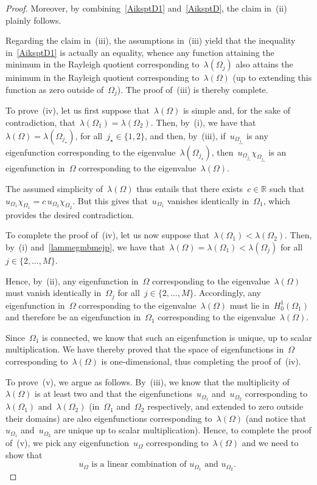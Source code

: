\documentclass[10pt,a4paper]{amsart}
\def \R {\mathbb{R}}
\begin{document}
\begin{proof}
Moreover, by combining~\eqref{AiksptD1} and~\eqref{AiksptD}, the claim in~(ii) plainly follows.

Regarding the claim in~(iii), the assumptions in~(iii) yield that the inequality in~\eqref{AiksptD1}
is actually an equality, whence any function attaining the minimum
in the Rayleigh quotient corresponding to~$\lambda(\Omega_j)$
also attains the minimum
in the Rayleigh quotient corresponding to~$\lambda(\Omega)$
(up to extending this function as zero outside of~$\Omega_j$).
The proof of~(iii) is thereby complete.

To prove~(iv), 
let us first suppose that~$\lambda(\Omega)$ is simple and, for the sake of
contradiction, that~$\lambda(\Omega_1)=\lambda(\Omega_2)$.
Then, by~(i), we have that~$\lambda(\Omega)=\lambda(\Omega_{j_\star})$, for all~$j_\star\in\{1,2\}$,
and then, by~(iii), if~$
u_{\Omega_{j_\star}}$ is any eigenfunction corresponding to the eigenvalue~$\lambda(\Omega_{j_\star})$,
then~$u_{\Omega_{j_\star}}\chi_{\Omega_{j_\star}}$ is
an eigenfunction in~$\Omega$ corresponding to the eigenvalue~$\lambda(\Omega)$.

The assumed simplicity of~$\lambda(\Omega)$ thus entails that there exists~$c\in\R$ such that~$ u_{\Omega_{1}}\chi_{\Omega_{1}}=c\,u_{\Omega_{2}}\chi_{\Omega_{2}}$. But this gives that~$u_{\Omega_1}$ vanishes identically
in~$\Omega_1$, which provides the desired contradiction.

To complete the proof of~(iv), let us now suppose that~$\lambda(\Omega_1)<\lambda(\Omega_2)$.
Then, by~(i) and~\eqref{lammegmbmejp}, we have that~$\lambda(\Omega)=\lambda(\Omega_1)<\lambda(\Omega_j)$
for all~$j\in\{2,\dots,M\}$.

Hence, by~(ii), any eigenfunction in~$\Omega$ corresponding to the eigenvalue~$\lambda(\Omega)$
must vanish identically in~$\Omega_j$ for all~$j\in\{2,\dots,M\}$.
Accordingly, any eigenfunction in~$\Omega$ corresponding to the eigenvalue~$\lambda(\Omega)$
must lie in~$H^1_0(\Omega_1)$
and therefore be an eigenfunction in~$\Omega_1$ corresponding to the eigenvalue~$\lambda(\Omega)$.

Since~$\Omega_1$ is connected, we know that such an eigenfunction is unique,
up to scalar multiplication. We have thereby proved that the space of eigenfunctions
in~$\Omega$ corresponding to~$\lambda(\Omega)$ is one-dimensional, thus completing the proof of~(iv).

To prove~(v), we argue as follows. By~(iii), we know that the multiplicity of~$\lambda(\Omega)$ is at least two and that the eigenfunctions~$u_{\Omega_1}$
and~$u_{\Omega_2}$ corresponding to~$\lambda(\Omega_1)$ and~$\lambda(\Omega_2)$ (in~$\Omega_1$ and~$\Omega_2$
respectively, and extended to zero outside their domains) are also eigenfunctions
corresponding to~$\lambda(\Omega)$
(and notice that~$u_{\Omega_1}$ and~$u_{\Omega_2}$ are unique up to scalar multiplication). Hence, to complete the proof of~(v), we pick any eigenfunction~$u_\Omega$ corresponding to~$\lambda(\Omega)$ and we need to show that
\begin{equation} \label{oqwdjfrptjnmuy43tghbnl1}
{\mbox{$u_{\Omega}$ is a linear combination of~$u_{\Omega_1}$ and~$u_{\Omega_2}$. }}\end{equation}


\end{proof}
\end{document}
